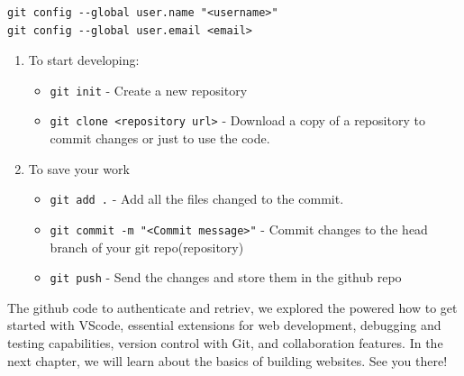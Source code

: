 \documentclass[
  paper=a4,
  ,captions=tableheading
]{scrbook}
\newcommand{\passthrough}[1]{#1}
\providecommand{\tightlist}{%
  \setlength{\itemsep}{0pt}\setlength{\parskip}{0pt}}
\begin{document}
\begin{lstlisting}
git config --global user.name "<username>"
git config --global user.email <email>
\end{lstlisting}

\begin{enumerate}
\def\labelenumi{\arabic{enumi}.}
\setcounter{enumi}{1}
\tightlist
\item
  To start developing:

  \begin{itemize}
  \tightlist
  \item
    \passthrough{\lstinline!git init!} - Create a new repository
  \item
    \passthrough{\lstinline!git clone <repository url>!} - Download a
    copy of a repository to commit changes or just to use the code.
  \end{itemize}
\item
  To save your work

  \begin{itemize}
  \tightlist
  \item
    \passthrough{\lstinline!git add .!} - Add all the files changed to
    the commit.
  \item
    \passthrough{\lstinline!git commit -m "<Commit message>"!} - Commit
    changes to the head branch of your git repo(repository)
  \item
    \passthrough{\lstinline!git push!} - Send the changes and store them
    in the github repo
  \end{itemize}
\end{enumerate}

The github code to authenticate and retriev, we explored the powered how
to get started with VScode, essential extensions for web development,
debugging and testing capabilities, version control with Git, and
collaboration features. In the next chapter, we will learn about the
basics of building websites. See you there!
\end{document}
